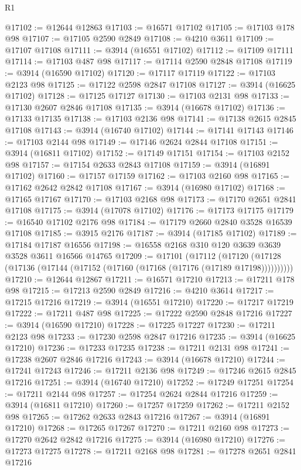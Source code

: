 \begin{lexlean}{R1}
\begin{coremodule}
@17102 := @12644 @12863
@17103 := @16571 @17102
@17105 := @17103 @178 @98
@17107 := @17105 @2590 @2849
@17108 := @4210 @3611
@17109 := @17107 @17108
@17111 := @3914 (@16551 @17102)
@17112 := @17109 @17111
@17114 := @17103 @487 @98
@17117 := @17114 @2590 @2848 @17108
@17119 := @3914 (@16590 @17102)
@17120 := @17117 @17119
@17122 := @17103 @2123 @98
@17125 := @17122 @2598 @2847 @17108
@17127 := @3914 (@16625 @17102)
@17128 := @17125 @17127
@17130 := @17103 @2131 @98
@17133 := @17130 @2607 @2846 @17108
@17135 := @3914 (@16678 @17102)
@17136 := @17133 @17135
@17138 := @17103 @2136 @98
@17141 := @17138 @2615 @2845 @17108
@17143 := @3914 (@16740 @17102)
@17144 := @17141 @17143
@17146 := @17103 @2144 @98
@17149 := @17146 @2624 @2844 @17108
@17151 := @3914 (@16811 @17102)
@17152 := @17149 @17151
@17154 := @17103 @2152 @98
@17157 := @17154 @2633 @2843 @17108
@17159 := @3914 (@16891 @17102)
@17160 := @17157 @17159
@17162 := @17103 @2160 @98
@17165 := @17162 @2642 @2842 @17108
@17167 := @3914 (@16980 @17102)
@17168 := @17165 @17167
@17170 := @17103 @2168 @98
@17173 := @17170 @2651 @2841 @17108
@17175 := @3914 (@17078 @17102)
@17176 := @17173 @17175
@17179 := @16540 @17102 @2176 @98
@17184 := @17179 @2660 @2840 @3528 @16539 @17108
@17185 := @3915 @2176
@17187 := @3914 (@17185 @17102)
@17189 := @17184 @17187 @16556
@17198 := @16558 @2168 @310 @120 @3639 @3639 @3528 @3611 @16566 @14765
@17209 := @17101
    (@17112 (@17120 (@17128 (@17136 (@17144 (@17152 (@17160 (@17168 (@17176 (@17189 @17198))))))))))
@17210 := @12644 @12867
@17211 := @16571 @17210
@17213 := @17211 @178 @98
@17215 := @17213 @2590 @2849
@17216 := @4210 @3614
@17217 := @17215 @17216
@17219 := @3914 (@16551 @17210)
@17220 := @17217 @17219
@17222 := @17211 @487 @98
@17225 := @17222 @2590 @2848 @17216
@17227 := @3914 (@16590 @17210)
@17228 := @17225 @17227
@17230 := @17211 @2123 @98
@17233 := @17230 @2598 @2847 @17216
@17235 := @3914 (@16625 @17210)
@17236 := @17233 @17235
@17238 := @17211 @2131 @98
@17241 := @17238 @2607 @2846 @17216
@17243 := @3914 (@16678 @17210)
@17244 := @17241 @17243
@17246 := @17211 @2136 @98
@17249 := @17246 @2615 @2845 @17216
@17251 := @3914 (@16740 @17210)
@17252 := @17249 @17251
@17254 := @17211 @2144 @98
@17257 := @17254 @2624 @2844 @17216
@17259 := @3914 (@16811 @17210)
@17260 := @17257 @17259
@17262 := @17211 @2152 @98
@17265 := @17262 @2633 @2843 @17216
@17267 := @3914 (@16891 @17210)
@17268 := @17265 @17267
@17270 := @17211 @2160 @98
@17273 := @17270 @2642 @2842 @17216
@17275 := @3914 (@16980 @17210)
@17276 := @17273 @17275
@17278 := @17211 @2168 @98
@17281 := @17278 @2651 @2841 @17216

\end{coremodule}
\end{lexlean}
